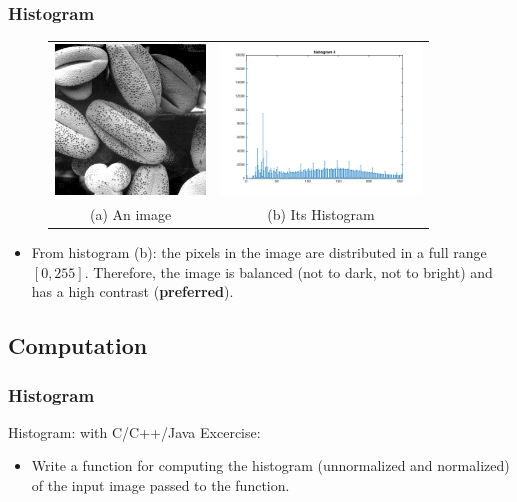 \documentclass[english,11pt,table,handout]{beamer}
\begin{document}
\begin{frame}[fragile]
\frametitle{Histogram}
\begin{figure}[!h]
	\begin{table}
		\begin{tabular}{cc}
			\includegraphics[height=4cm]{./images/bean4.jpg} &
			\includegraphics[height=4cm]{./images/histogram4.png} \\
			(a) An image & (b) Its Histogram
		\end{tabular}
	\end{table}
\end{figure}
\begin{itemize}
	\item From histogram (b): the pixels in the image are distributed in a full range $[0,255]$. Therefore, the image is balanced (not to dark, not to bright) and has a high contrast (\textbf{preferred}).
\end{itemize}
\end{frame}

\subsection{Computation}
\begin{frame}[fragile]
\frametitle{Histogram}
\begin{block}{Histogram: with C/C++/Java}
	Excercise:
	\begin{itemize}
		\item Write a function for computing the histogram (unnormalized and normalized) of the input image passed to the function.
		
	\end{itemize}
\end{block}
\end{frame}
\end{document}
